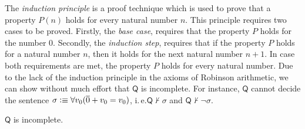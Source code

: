 The \textit{induction principle} is a proof technique which is used to prove that a property $P(n)$ holds for every natural number $n$. This principle requires two cases to be proved. Firstly, the \textit{base case}, requires that the property $P$ holds for the number $0$. Secondly, the \textit{induction step}, requires that if the property $P$ holds for a natural number $n$, then it holds for the next natural number $n+1$. In case both requirements are met, the property $P$ holds for every natural number. Due to the lack of the induction principle in the axioms of Robinson arithmetic, we can show without much effort that $\mathsf{Q}$ is incomplete. For instance, $\mathsf{Q}$ cannot decide the sentence $\sigma \vcentcolon \equiv \forall v_0 (\overline{0} + v_0 = v_0 )$, i.\,e.\@ $\mathsf{Q} \nvdash \sigma$ and $\mathsf{Q} \nvdash \lnot \sigma$.
\begin{thm}
$\mathsf{Q}$ is incomplete.
\end{thm}
